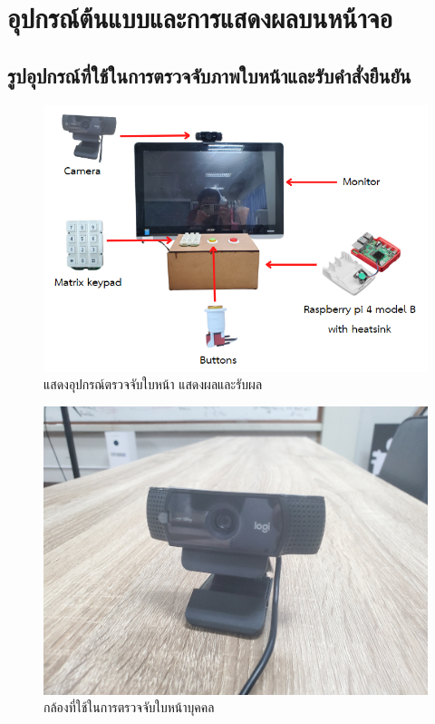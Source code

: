 \chapter{อุปกรณ์ต้นแบบและการแสดงผลบนหน้าจอ}



\section{รูปอุปกรณ์ที่ใช้ในการตรวจจับภาพใบหน้าและรับคำสั่งยืนยัน}

\begin{figure}[!ht]
  \begin{center}
    \includegraphics[scale=.6]{pic/overall_module.png}
    \caption[Module]{แสดงอุปกรณ์ตรวจจับใบหน้า แสดงผลและรับผล}
    \label{fig:module_pi}
  \end{center}
\end{figure}




\begin{figure}[!ht]
  \begin{center}
    \includegraphics[scale=.15]{pic/camera.jpg}
    \caption[camera]{กล้องที่ใช้ในการตรวจจับใบหน้าบุคคล}
    \label{fig:camera_logi}
  \end{center}
\end{figure}

